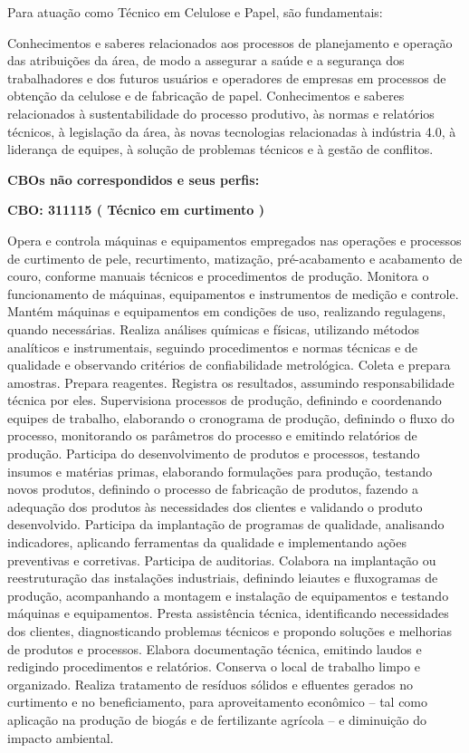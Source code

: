 \documentclass[
]{article}
\begin{document}
Para atuação como Técnico em Celulose e Papel, são fundamentais:

Conhecimentos e saberes relacionados aos processos de planejamento e
operação das atribuições da área, de modo a assegurar a saúde e a
segurança dos trabalhadores e dos futuros usuários e operadores de
empresas em processos de obtenção da celulose e de fabricação de papel.
Conhecimentos e saberes relacionados à sustentabilidade do processo
produtivo, às normas e relatórios técnicos, à legislação da área, às
novas tecnologias relacionadas à indústria 4.0, à liderança de equipes,
à solução de problemas técnicos e à gestão de conflitos.

\textbf{CBOs não correspondidos e seus perfis:}

\textbf{CBO: 311115  ( Técnico em curtimento )}

Opera e controla máquinas e equipamentos empregados nas operações e
processos de curtimento de pele, recurtimento, matização, pré-acabamento
e acabamento de couro, conforme manuais técnicos e procedimentos de
produção. Monitora o funcionamento de máquinas, equipamentos e
instrumentos de medição e controle. Mantém máquinas e equipamentos em
condições de uso, realizando regulagens, quando necessárias. Realiza
análises químicas e físicas, utilizando métodos analíticos e
instrumentais, seguindo procedimentos e normas técnicas e de qualidade e
observando critérios de confiabilidade metrológica. Coleta e prepara
amostras. Prepara reagentes. Registra os resultados, assumindo
responsabilidade técnica por eles. Supervisiona processos de produção,
definindo e coordenando equipes de trabalho, elaborando o cronograma de
produção, definindo o fluxo do processo, monitorando os parâmetros do
processo e emitindo relatórios de produção. Participa do desenvolvimento
de produtos e processos, testando insumos e matérias primas, elaborando
formulações para produção, testando novos produtos, definindo o processo
de fabricação de produtos, fazendo a adequação dos produtos às
necessidades dos clientes e validando o produto desenvolvido. Participa
da implantação de programas de qualidade, analisando indicadores,
aplicando ferramentas da qualidade e implementando ações preventivas e
corretivas. Participa de auditorias. Colabora na implantação ou
reestruturação das instalações industriais, definindo leiautes e
fluxogramas de produção, acompanhando a montagem e instalação de
equipamentos e testando máquinas e equipamentos. Presta assistência
técnica, identificando necessidades dos clientes, diagnosticando
problemas técnicos e propondo soluções e melhorias de produtos e
processos. Elabora documentação técnica, emitindo laudos e redigindo
procedimentos e relatórios. Conserva o local de trabalho limpo e
organizado. Realiza tratamento de resíduos sólidos e efluentes gerados
no curtimento e no beneficiamento, para aproveitamento econômico -- tal
como aplicação na produção de biogás e de fertilizante agrícola -- e
diminuição do impacto ambiental.
\end{document}
